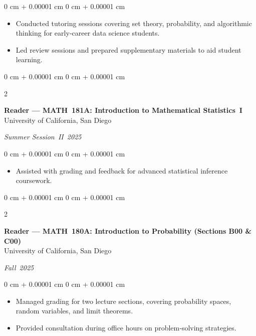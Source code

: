 \documentclass[10pt, letterpaper]{article}
\newenvironment{highlights}{
    \begin{itemize}[
        topsep=0.10 cm,
        parsep=0.10 cm,
        partopsep=0pt,
        itemsep=0pt,
        leftmargin=0 cm + 10pt
    ]
}{
    \end{itemize}
} %
\newenvironment{onecolentry}{
    \begin{adjustwidth}{
        0 cm + 0.00001 cm
    }{
        0 cm + 0.00001 cm
    }
}{
    \end{adjustwidth}
} %
\newenvironment{twocolentry}[2][]{
    \onecolentry
    \def\secondColumn{#2}
    \setcolumnwidth{\fill, 4.5 cm}
    \begin{paracol}{2}
}{
    \switchcolumn \raggedleft \secondColumn
    \end{paracol}
    \endonecolentry
} %
\begin{document}
    \vspace{0.10 cm}
    \begin{onecolentry}
        \begin{highlights}
            \item Conducted tutoring sessions covering set theory, probability, and algorithmic thinking for early‑career data science students.
            \item Led review sessions and prepared supplementary materials to aid student learning.
        \end{highlights}
    \end{onecolentry}

    \vspace{0.15 cm}

    \begin{twocolentry}{\textit{Summer Session II 2025}}
        \textbf{Reader — MATH 181A: Introduction to Mathematical Statistics I} \\
        University of California, San Diego
    \end{twocolentry}

    \vspace{0.10 cm}
    \begin{onecolentry}
        \begin{highlights}
            \item Assisted with grading and feedback for advanced statistical inference coursework.
        \end{highlights}
    \end{onecolentry}

    \vspace{0.15 cm}

    \begin{twocolentry}{\textit{Fall 2025}}
        \textbf{Reader — MATH 180A: Introduction to Probability (Sections B00 \& C00)} \\
        University of California, San Diego
    \end{twocolentry}

    \vspace{0.10 cm}
    \begin{onecolentry}
        \begin{highlights}
            \item Managed grading for two lecture sections, covering probability spaces, random variables, and limit theorems.
            \item Provided consultation during office hours on problem‑solving strategies.
        \end{highlights}
    \end{onecolentry}
\end{document}
